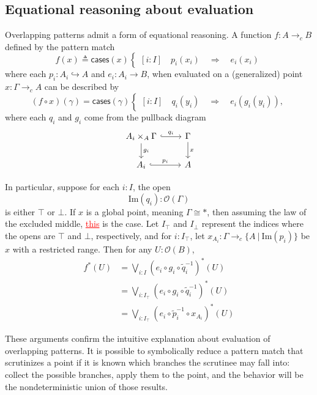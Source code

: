 \documentclass[conference]{IEEEtran}
\newcommand{\hookto}{\hookrightarrow}
\newcommand{\cto}{\to_c}
\newcommand{\suchthat}{\ |\ }
\newcommand{\One}{\ast}
\newcommand{\Open}[1]{\mathcal{O}({#1})}
\newcommand{\Img}[1]{\text{Im}\left({#1}\right)}
\newcommand{\Branch}{\Rightarrow}
\newcommand{\iimg}[1]{{#1}^*}
\newcommand{\grammar}[1]{\textcolor{red}{\underline{#1}}}
\begin{document}
\subsection{Equational reasoning about evaluation}

Overlapping patterns admit a form of equational reasoning. A function $f : A \cto B$ defined by the pattern match
\[
f(x) \triangleq \mathsf{cases}(x)
\begin{cases}
[i : I] \quad p_i(x_i) \quad \Branch \quad e_i(x_i)
\end{cases}
\]
where each $p_i : A_i \hookto A$ and $e_i : A_i \to B$,
when evaluated on a (generalized) point $x : \Gamma \cto A$
can be described by
\[
(f \circ x)(\gamma) = \mathsf{cases}(\gamma)
\begin{cases}
[i : I] \quad q_i(y_i) \quad \Branch \quad e_i(g_i(y_i)),
\end{cases}
\]
where each $q_i$ and $g_i$ come from the pullback diagram
\begin{equation*}
\begin{tikzcd}
A_i \times_A \Gamma \arrow[r, hook, "q_i"]
   \arrow[d, "g_i"]
& \Gamma \arrow[d, "x"]
\\ A_i \arrow[r, hook, "p_i"]
& A
\end{tikzcd}
\end{equation*}

In particular, suppose for each $i : I$, the open
\[
\Img{q_i} : \Open{\Gamma}
\]
is either $\top$ or $\bot$. If $x$ is a global point, meaning $\Gamma \cong \One$, then assuming the law of the excluded middle, \grammar{this} is the case. Let $I_\top$ and $I_\bot$ represent the indices where the opens are $\top$ and $\bot$, respectively, and for $i : I_\top$, let $x_{A_i} : \Gamma \cto \{ A \suchthat \Img{p_i} \}$ be $x$ with a restricted range. Then for any $U : \Open{B}$,
\begin{align*}
\iimg{f}(U) &= \bigvee_{i : I} \iimg{(e_i \circ g_i \circ \tilde{q}_i^{-1})}(U)
\\ &= \bigvee_{i : I_\top} \iimg{(e_i \circ g_i \circ \tilde{q}_i^{-1})}(U)
\\ &= \bigvee_{i : I_\top} \iimg{(e_i \circ \tilde{p}_i^{-1} \circ x_{A_i})}(U)
\end{align*}

These arguments confirm the intuitive explanation about evaluation of overlapping patterns. It is possible to symbolically reduce a pattern match that scrutinizes a point if it is known which branches the scrutinee may fall into: collect the possible branches, apply them to the point, and the behavior will be the nondeterministic union of those results.
\end{document}
